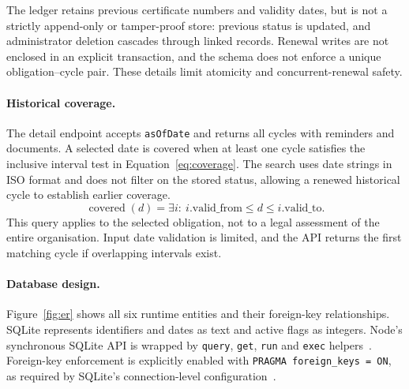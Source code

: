 The ledger retains previous certificate numbers and validity dates, but is not a strictly append-only or tamper-proof store: previous status is updated, and administrator deletion cascades through linked records. Renewal writes are not enclosed in an explicit transaction, and the schema does not enforce a unique obligation--cycle pair. These details limit atomicity and concurrent-renewal safety.

\paragraph{Historical coverage.}
The detail endpoint accepts \texttt{asOfDate} and returns all cycles with reminders and documents. A selected date is covered when at least one cycle satisfies the inclusive interval test in Equation~\ref{eq:coverage}. The search uses date strings in ISO format and does not filter on the stored status, allowing a renewed historical cycle to establish earlier coverage.
\begin{equation}
\operatorname{covered}(d)=\exists i:\ i.\mathrm{valid\_from}\leq d\leq i.\mathrm{valid\_to}.
\label{eq:coverage}
\end{equation}
This query applies to the selected obligation, not to a legal assessment of the entire organisation. Input date validation is limited, and the API returns the first matching cycle if overlapping intervals exist.

\paragraph{Database design.}
Figure~\ref{fig:er} shows all six runtime entities and their foreign-key relationships. SQLite represents identifiers and dates as text and active flags as integers. Node's synchronous SQLite API is wrapped by \texttt{query}, \texttt{get}, \texttt{run} and \texttt{exec} helpers~\cite{nodesqlite}. Foreign-key enforcement is explicitly enabled with \texttt{PRAGMA foreign\_keys = ON}, as required by SQLite's connection-level configuration~\cite{sqlite}.

